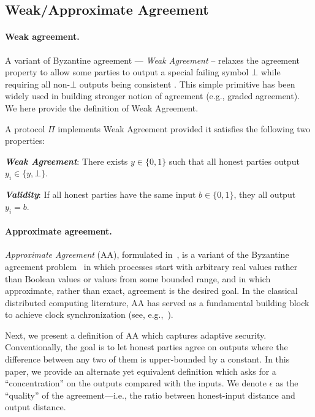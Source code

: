 \subsection{Weak/Approximate Agreement}
\label{subsec:weak-approximate-agreement}

\paragraph{Weak agreement.}
%
A variant of Byzantine agreement --- \emph{Weak Agreement} -- relaxes the agreement property to allow some parties to output a special failing symbol $\bot$ while requiring all non-$\bot$ outputs being consistent \cite{JoA:Dolev82}.
%
This simple primitive has been widely used in building stronger notion of agreement (e.g., graded agreement).
%
We here provide the definition of Weak Agreement.

\begin{definition}
    \label{def:weak-agreement}
    A protocol $\Pi$ implements Weak Agreement provided it satisfies the following two properties:
    \begin{cccItemize}[nosep]
        \item \emph{\textbf{Weak Agreement}}: There exists $y \in \{0, 1\}$ such that all honest parties output $y_i \in \{ y, \bot \}$.

        \item \emph{\textbf{Validity}}: If all honest parties have the same input $b \in \{0, 1\}$, they all output $y_i = b$.
    \end{cccItemize}
\end{definition}

\paragraph{Approximate agreement.}
%
\emph{Approximate Agreement} (AA), formulated in~\cite{JACM:DLPSW86}, is a variant of the Byzantine agreement problem~\cite{JACM:PeaShoLam80,TOPLAS:LamShoPea82} in which processes start with arbitrary real values rather than Boolean values or values from some bounded range, and in which approximate, rather than exact, agreement is the desired goal.
%
In the classical distributed computing literature, AA has served as a fundamental building block to achieve clock synchronization (see, e.g.,~\cite{PODC:LunLyn84,PODC:MahSch85,PODC:LenLos22}).

Next, we present a definition of AA which captures adaptive security.
%
Conventionally, the goal is to let honest parties agree on outputs where the difference between any two of them is upper-bounded by a constant.
%
In this paper, we provide an alternate yet equivalent definition which asks for a ``concentration'' on the outputs compared with the inputs.
%
We denote $\epsilon$ as the ``quality'' of the agreement---i.e., the ratio between honest-input distance and output distance.


